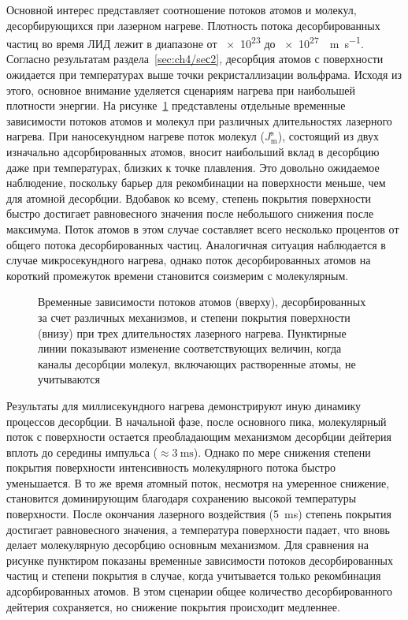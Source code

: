 Основной интерес представляет соотношение потоков атомов и молекул, десорбирующихся при лазерном нагреве. Плотность потока десорбированных частиц во время ЛИД лежит в диапазоне от \num{e23} до \SI{e27}{\per\meter\per\second}. Согласно результатам раздела~\cref{sec:ch4/seс2}, десорбция атомов с поверхности ожидается при температурах выше точки рекристаллизации вольфрама. Исходя из этого, основное внимание уделяется сценариям нагрева при наибольшей плотности энергии. На рисунке~\cref{fig:ch4/LID_fluxes} представлены отдельные временные зависимости потоков атомов и молекул при различных длительностях лазерного нагрева. При наносекундном нагреве поток молекул ($J_\mathrm{m}^\mathrm{s}$), состоящий из двух изначально адсорбированных атомов, вносит наибольший вклад в десорбцию даже при температурах, близких к точке плавления. Это довольно ожидаемое наблюдение, поскольку барьер для рекомбинации на поверхности меньше, чем для атомной десорбции. Вдобавок ко всему, степень покрытия поверхности быстро достигает равновесного значения после небольшого снижения после максимума. Поток атомов в этом случае составляет всего несколько процентов от общего потока десорбированных частиц. Аналогичная ситуация наблюдается в случае микросекундного нагрева, однако поток десорбированных атомов на короткий промежуток времени становится соизмерим с молекулярным.

\begin{figure}[ht]
    \caption{Временные зависимости потоков атомов (вверху), десорбированных за счет различных механизмов, и степени покрытия поверхности (внизу) при трех длительностях лазерного нагрева. Пунктирные линии показывают изменение соответствующих величин, когда каналы десорбции молекул, включающих растворенные атомы, не учитываются}\label{fig:ch4/LID_fluxes}
\end{figure}

Результаты для миллисекундного нагрева демонстрируют иную динамику процессов десорбции. В начальной фазе, после основного пика, молекулярный поток с поверхности остается преобладающим механизмом десорбции дейтерия вплоть до середины импульса (\( \approx \SI{3}{\milli\second} \)). Однако по мере снижения степени покрытия поверхности интенсивность молекулярного потока быстро уменьшается. В то же время атомный поток, несмотря на умеренное снижение, становится доминирующим благодаря сохранению высокой температуры поверхности. После окончания лазерного воздействия (\SI{5}{\milli\second}) степень покрытия достигает равновесного значения, а температура поверхности падает, что вновь делает молекулярную десорбцию основным механизмом. Для сравнения на рисунке пунктиром показаны временные зависимости потоков десорбированных частиц и степени покрытия в случае, когда учитывается только рекомбинация адсорбированных атомов. В этом сценарии общее количество десорбированного дейтерия сохраняется, но снижение покрытия происходит медленнее.


